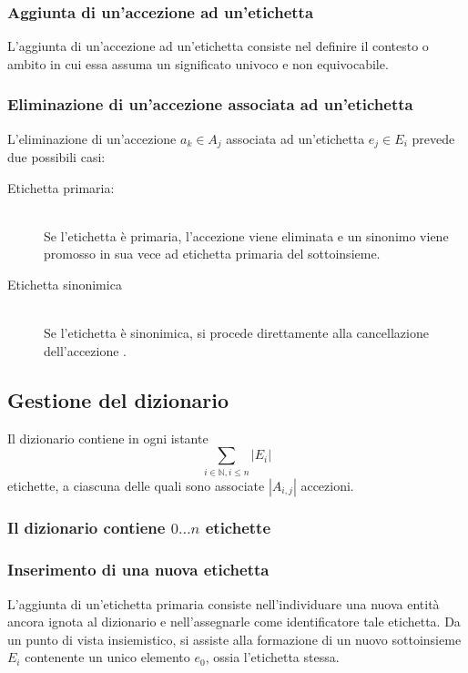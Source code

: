 \documentclass[10pt,a4paper,headinclude,footinclude,hidelinks]{scrreprt} %
\begin{document}
	\subsubsection{Aggiunta di un'accezione ad un'etichetta}
	L'aggiunta di un'accezione ad un'etichetta consiste nel definire il contesto o ambito in cui essa assuma un significato univoco e non equivocabile.

	\subsubsection{Eliminazione di un'accezione associata ad un'etichetta}
	L'eliminazione di un'accezione $a_k \in A_j$ associata ad un'etichetta $e_j \in E_i$ prevede due possibili casi:
	\begin{description}
	\item[Etichetta primaria:] \hfill \\
	Se l'etichetta è primaria, l'accezione viene eliminata e un sinonimo viene promosso in sua vece ad etichetta primaria del sottoinsieme.
 	\item[Etichetta sinonimica] \hfill \\
	Se l'etichetta è sinonimica, si procede direttamente alla cancellazione dell'accezione	.
	\end{description}

	\subsection{Gestione del dizionario}
	Il dizionario contiene in ogni istante $$\sum_{i \in \mathbb{N}, i \leq n}\left|E_i\right|$$ etichette, a ciascuna delle quali sono associate $\left|A_{i,j}\right|$ accezioni.

	\subsubsection{Il dizionario contiene $0\ldots n$ etichette}

	\subsubsection{Inserimento di una nuova etichetta}
	L'aggiunta di un'etichetta primaria consiste nell'individuare una nuova entità ancora ignota al dizionario e nell'assegnarle come identificatore tale etichetta. Da un punto di vista insiemistico, si assiste alla formazione di un nuovo sottoinsieme $E_i$ contenente un unico elemento $e_0$, ossia l'etichetta stessa.
\end{document}
